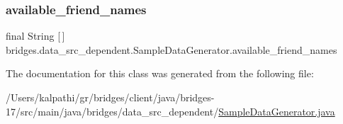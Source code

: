\subsubsection{\texorpdfstring{available\+\_\+friend\+\_\+names}{available\_friend\_names}}
{\footnotesize\ttfamily final String \mbox{[}$\,$\mbox{]} bridges.\+data\+\_\+src\+\_\+dependent.\+Sample\+Data\+Generator.\+available\+\_\+friend\+\_\+names\hspace{0.3cm}{\ttfamily [static]}}



The documentation for this class was generated from the following file\+:\begin{DoxyCompactItemize}
\item 
/\+Users/kalpathi/gr/bridges/client/java/bridges-\/17/src/main/java/bridges/data\+\_\+src\+\_\+dependent/\mbox{\hyperlink{_sample_data_generator_8java}{Sample\+Data\+Generator.\+java}}\end{DoxyCompactItemize}
